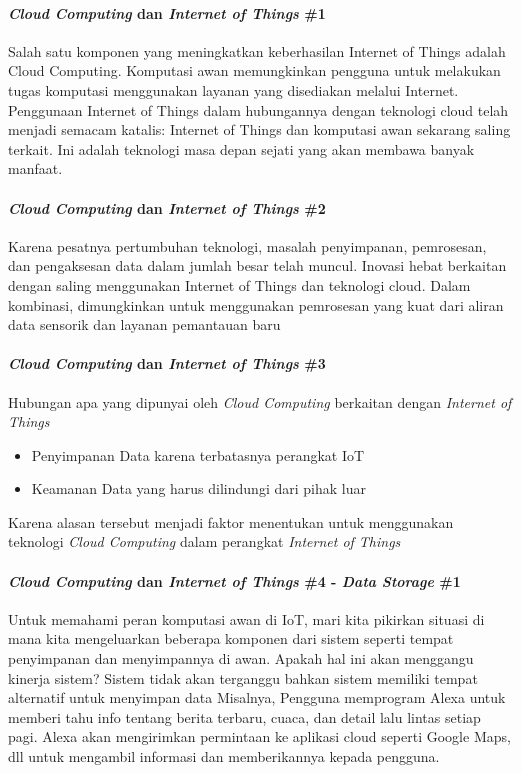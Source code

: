 \begin{frame}{\insertsectionhead}
	\framesubtitle{\textit{Cloud Computing} dan \textit{Internet of Things} \#1}
	\justifying 
	Salah satu komponen yang meningkatkan keberhasilan Internet of Things adalah Cloud Computing. Komputasi awan memungkinkan pengguna untuk melakukan tugas komputasi menggunakan layanan yang disediakan melalui Internet. 
	\vfill
	Penggunaan Internet of Things dalam hubungannya dengan teknologi cloud telah menjadi semacam katalis: Internet of Things dan komputasi awan sekarang saling terkait. Ini adalah teknologi masa depan sejati yang akan membawa banyak manfaat.
\end{frame}

\begin{frame}{\insertsectionhead}
	\framesubtitle{\textit{Cloud Computing} dan \textit{Internet of Things} \#2}
	\justifying 
	Karena pesatnya pertumbuhan teknologi, masalah penyimpanan, pemrosesan, dan pengaksesan data dalam jumlah besar telah muncul. Inovasi hebat berkaitan dengan saling menggunakan Internet of Things dan teknologi cloud. Dalam kombinasi, dimungkinkan untuk menggunakan pemrosesan yang kuat dari aliran data sensorik dan layanan pemantauan baru
\end{frame}

\begin{frame}{\insertsectionhead}
	\framesubtitle{\textit{Cloud Computing} dan \textit{Internet of Things} \#3}
	\justifying 
	Hubungan apa yang dipunyai oleh \textit{Cloud Computing} berkaitan dengan \textit{Internet of Things}
	\vfill
	\begin{itemize}
		\item Penyimpanan Data karena terbatasnya perangkat IoT
		\item Keamanan Data yang harus dilindungi dari pihak luar
	\end{itemize}
	\vfill
	Karena alasan tersebut menjadi faktor menentukan untuk menggunakan teknologi \textit{Cloud Computing} dalam perangkat \textit{Internet of Things}
\end{frame}

\begin{frame}{\insertsectionhead}
	\framesubtitle{\textit{Cloud Computing} dan \textit{Internet of Things} \#4 - \textit{Data Storage} \#1}
	\justifying 
	Untuk memahami peran komputasi awan di IoT, mari kita pikirkan situasi di mana kita mengeluarkan beberapa komponen dari sistem seperti tempat penyimpanan dan menyimpannya di awan. Apakah hal ini akan menggangu kinerja sistem? Sistem tidak akan terganggu bahkan sistem memiliki tempat alternatif untuk menyimpan data
	\vfill
	Misalnya, Pengguna memprogram Alexa untuk memberi tahu info tentang berita terbaru, cuaca, dan detail lalu lintas setiap pagi. Alexa akan mengirimkan permintaan ke aplikasi cloud seperti Google Maps, dll untuk mengambil informasi dan memberikannya kepada pengguna.
\end{frame}

